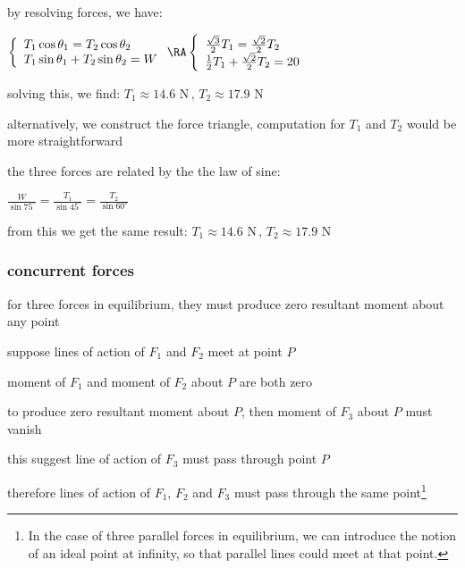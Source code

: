 

\sol by resolving forces, we have: 

{
	\centering
	
	$ \left\{\begin{array}{l}
		T_1 \cos\theta_1 = T_2 \cos\theta_2\\
		T_1\sin\theta_1 + T_2\sin\theta_2 = W
	\end{array} \right.
	\RA
	\left\{\begin{array}{l}
	\frac{\sqrt{3}}{2}T_1 = \frac{\sqrt{2}}{2}T_2\\
	\frac{1}{2}T_1 + \frac{\sqrt{2}}{2}T_2 = 20
	\end{array} \right.
	$
	
}


\eqyskip solving this, we find: $T_1 \approx 14.6\text{ N}\, , \, T_2 \approx 17.9\text{ N} $

alternatively, we construct the force triangle, computation for $T_1$ and $T_2$ would be more straightforward

the three forces are related by the the law of sine:

{
	\centering
	
	$\frac{W}{\sin75^\circ} = \frac{T_1}{\sin45^\circ} = \frac{T_2}{\sin60^\circ} $
	
}

from this we get the same result: $T_1 \approx 14.6\text{ N}\, , \, T_2 \approx 17.9\text{ N} $ \eoe



\subsubsection{concurrent forces}

for three forces in equilibrium, they must produce zero resultant moment about any point

suppose lines of action of $F_1$ and $F_2$ meet at point $P$

moment of $F_1$ and moment of $F_2$ about $P$ are both zero

to produce zero resultant moment about $P$, then moment of $F_3$ about $P$ must vanish

this suggest line of action of $F_3$ must pass through point $P$

therefore lines of action of $F_1$, $F_2$ and $F_3$ must pass through the same point\footnote{In the case of three parallel forces in equilibrium, we can introduce the notion of an ideal point at infinity, so that parallel lines could meet at that point.}

